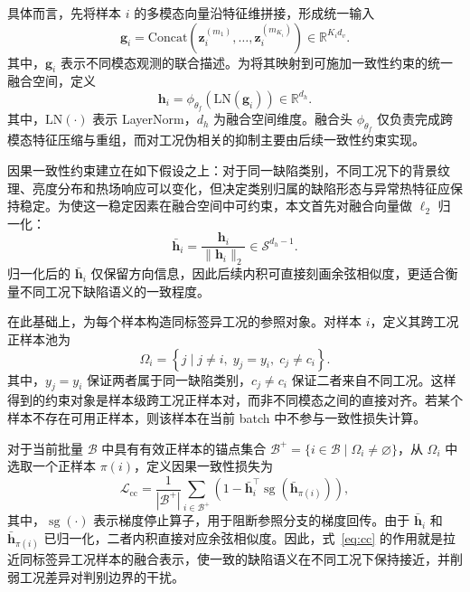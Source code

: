 \documentclass[journal]{IEEEtran}
\newcommand{\sg}{\operatorname{sg}}
\begin{document}
具体而言，先将样本 $i$ 的多模态向量沿特征维拼接，形成统一输入
\begin{equation}
\mathbf{g}_i = \mathrm{Concat}\!\left(\mathbf{z}_i^{(m_1)}, \dots, \mathbf{z}_i^{(m_{K_i})}\right) \in \mathbb{R}^{K_i d_v}.
\label{eq:concat}
\end{equation}
其中，$\mathbf{g}_i$ 表示不同模态观测的联合描述。为将其映射到可施加一致性约束的统一融合空间，定义
\begin{equation}
\mathbf{h}_i = \phi_{\theta_f}\!\left(\mathrm{LN}(\mathbf{g}_i)\right) \in \mathbb{R}^{d_h}.
\label{eq:fusion}
\end{equation}
其中，$\mathrm{LN}(\cdot)$ 表示 LayerNorm，$d_h$ 为融合空间维度。融合头 $\phi_{\theta_f}$ 仅负责完成跨模态特征压缩与重组，而对工况伪相关的抑制主要由后续一致性约束实现。

因果一致性约束建立在如下假设之上：对于同一缺陷类别，不同工况下的背景纹理、亮度分布和热场响应可以变化，但决定类别归属的缺陷形态与异常热特征应保持稳定。为使这一稳定因素在融合空间中可约束，本文首先对融合向量做 $\ell_2$ 归一化：
\begin{equation}
\bar{\mathbf{h}}_i = \frac{\mathbf{h}_i}{\|\mathbf{h}_i\|_2} \in \mathcal{S}^{d_h-1}.
\label{eq:norm}
\end{equation}
归一化后的 $\bar{\mathbf{h}}_i$ 仅保留方向信息，因此后续内积可直接刻画余弦相似度，更适合衡量不同工况下缺陷语义的一致程度。

在此基础上，为每个样本构造同标签异工况的参照对象。对样本 $i$，定义其跨工况正样本池为
\begin{equation}
\Omega_i = \left\{ j \mid j \neq i,\; y_j = y_i,\; c_j \neq c_i \right\}.
\label{eq:pool}
\end{equation}
其中，$y_j = y_i$ 保证两者属于同一缺陷类别，$c_j \neq c_i$ 保证二者来自不同工况。这样得到的约束对象是样本级跨工况正样本对，而非不同模态之间的直接对齐。若某个样本不存在可用正样本，则该样本在当前 batch 中不参与一致性损失计算。

对于当前批量 $\mathcal{B}$ 中具有有效正样本的锚点集合 $\mathcal{B}^{+}=\{i\in\mathcal{B}\mid\Omega_i\neq\varnothing\}$，从 $\Omega_i$ 中选取一个正样本 $\pi(i)$，定义因果一致性损失为
\begin{equation}
\mathcal{L}_{\mathrm{cc}} =
\frac{1}{|\mathcal{B}^{+}|}
\sum_{i\in\mathcal{B}^{+}}
\left(
1-\bar{\mathbf{h}}_i^{\top}\sg\!\left(\bar{\mathbf{h}}_{\pi(i)}\right)
\right),
\label{eq:cc}
\end{equation}
其中，$\sg(\cdot)$ 表示梯度停止算子，用于阻断参照分支的梯度回传。由于 $\bar{\mathbf{h}}_i$ 和 $\bar{\mathbf{h}}_{\pi(i)}$ 已归一化，二者内积直接对应余弦相似度。因此，式~\eqref{eq:cc} 的作用就是拉近同标签异工况样本的融合表示，使一致的缺陷语义在不同工况下保持接近，并削弱工况差异对判别边界的干扰。
\end{document}
